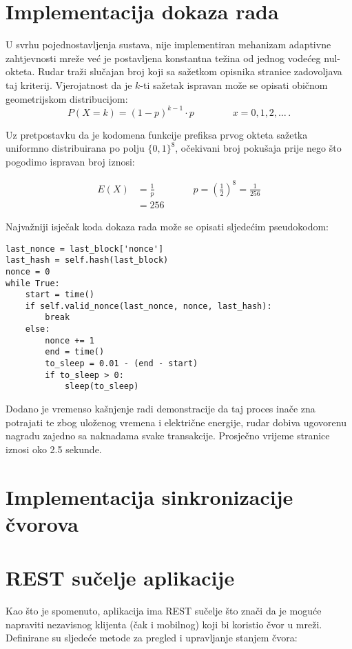 \documentclass[utf8, zavrsni]{fer}
\begin{document}
\section{Implementacija dokaza rada}
U svrhu pojednostavljenja sustava, nije implementiran mehanizam adaptivne zahtjevnosti mreže već je postavljena konstantna težina od jednog vodećeg nul-okteta. Rudar traži slučajan broj koji sa sažetkom opisnika stranice zadovoljava taj kriterij. Vjerojatnost da je $k$-ti sažetak ispravan može se opisati običnom geometrijskom distribucijom:
$$
P(X=k) = (1 - p) ^ {k-1} \cdot p \qquad \qquad x=0,1,2,\ldots \, .
$$

Uz pretpostavku da je kodomena funkcije prefiksa prvog okteta sažetka uniformno distribuirana po polju $\{0,1\} ^{8}$, očekivani broj pokušaja prije nego što pogodimo ispravan broj iznosi:

\begin{equation} \label{eq1}
\begin{split}
E(X) &= \frac{1}{p} \qquad \qquad p = (\frac{1}{2}) ^ {8} = \frac{1}{256} \\
     &= 256
\end{split}
\end{equation}

Najvažniji isječak koda dokaza rada može se opisati sljedećim pseudokodom:

\begin{verbatim}
last_nonce = last_block['nonce']
last_hash = self.hash(last_block)
nonce = 0
while True:
	start = time()
	if self.valid_nonce(last_nonce, nonce, last_hash):
		break
	else:
		nonce += 1
		end = time()
		to_sleep = 0.01 - (end - start)
		if to_sleep > 0:
		    sleep(to_sleep)

\end{verbatim}
Dodano je vremenso kašnjenje radi demonstracije da taj proces inače zna potrajati te zbog uloženog vremena i električne energije, rudar dobiva ugovorenu nagradu zajedno sa naknadama svake transakcije. Prosječno vrijeme stranice iznosi oko 2.5 sekunde.

\section{Implementacija sinkronizacije čvorova}

\section{REST sučelje aplikacije}
Kao što je spomenuto, aplikacija ima REST sučelje što znači da je moguće napraviti nezavisnog klijenta (čak i mobilnog) koji bi koristio čvor u mreži. Definirane su sljedeće metode za pregled i upravljanje stanjem čvora:
\end{document}
